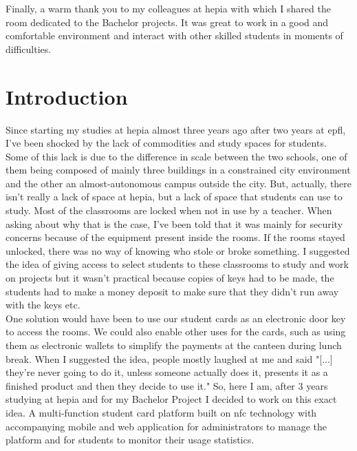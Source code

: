 \documentclass[twoside, openright,11pt,a4paper]{book}
\begin{document}

Finally, a  warm thank you to my colleagues at hepia with which I shared the room dedicated to the Bachelor projects. It was great to work in a good and comfortable environment and interact with other skilled students in moments of difficulties.
\printglossary[title=Terms and Definitions]
\mainmatter
\clearpage
\pagestyle{hepia-fancy}
\chapter{Introduction}
Since starting my studies at hepia almost three years ago after two years at \gls{epfl}, I've been shocked by the lack of commodities and study spaces for students. Some of this lack is due to the difference in scale between the two schools, one of them being composed of mainly three buildings in a constrained city environment and the other an almost-autonomous campus outside the city. But, actually, there isn't really a lack of space at hepia, but a lack of space that students can use to study. Most of the classrooms are locked when not in use by a teacher. When asking about why that is the case, I've been told that it was mainly for security concerns because of the equipment present inside the rooms. If the rooms stayed unlocked, there was no way of knowing who stole or broke something. I suggested the idea of giving access to select students to these classrooms to study and work on projects but it wasn't practical because copies of keys had to be made, the students had to make a money deposit to make sure that they didn't run away with the keys etc.\\ 

One solution would have been to use our student cards as an electronic door key to access the rooms. We could also enable other uses for the cards, such as using them as electronic wallets to simplify the payments at the canteen during lunch break. When I suggested the idea, people mostly laughed at me and said "[...] they're never going to do it, unless someone actually does it, presents it as a finished product and then they decide to use it." So, here I am, after 3 years studying at hepia and for my Bachelor Project I decided to work on this exact idea. A multi-function student card platform built on \gls{nfc} technology with accompanying mobile and web application for administrators to manage the platform and for students to monitor their usage statistics.
\end{document}
